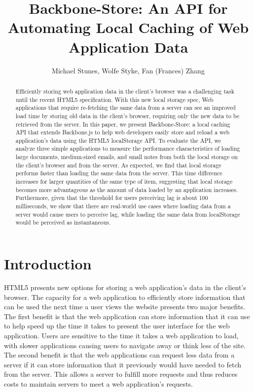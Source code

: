 \documentclass[12pt]{article}
\title{Backbone-Store: An API for Automating Local Caching of Web Application
Data}
\author{Michael Stunes, Wolfe Styke, Fan (Frances) Zhang}
\begin{document}
\maketitle

\begin{abstract}
Efficiently storing web application data in the client's browser was a
challenging task until the recent HTML5 specification. With this new local storage spec, Web applications that require re-fetching the same data from a server
can see an improved load time by storing old data in the client's browser,
requiring only the new data to be retrieved from the server. In this paper, we present Backbone-Store: a local caching API that extends Backbone.js to help web developers easily store and reload a web application's data using the HTML5 localStorage API. To evaluate the API,  we analyze three simple applications to measure the performance characteristics of loading large
documents, medium-sized emails, and small notes from both the local storage on
the client's browser and from the server. As expected, we find that local storage performs
faster than loading the same data from the server. This time difference
increases for larger quantities of the same type of item, suggesting that local storage becomes more advantageous as the amount of data loaded by an application increases. Furthermore, given that the threshold
for users perceiving lag is about 100 milliseconds, we show that there are
real-world use cases where loading data from a server would cause users to
perceive lag, while loading the same data from localStorage would be perceived
as instantaneous.
\end{abstract}

\section{Introduction}

HTML5 presents new options for storing a web application's data in the client's
browser. The capacity for a web application to efficiently store information
that can be used the next time a user views the website presents two major
benefits. The first benefit is that the web application can store information
that it can use to help speed up the time it takes to present the user
interface for the web application. Users are sensitive to the time it takes a
web application to load, with slower applications causing users to navigate
away or think less of the site. The second benefit is that the web applications
can request less data from a server if it can store information that it
previously would have needed to fetch from the server. This allows a server to
fulfill more requests and thus reduces costs to maintain servers to meet a web
application's requests.
\end{document}
